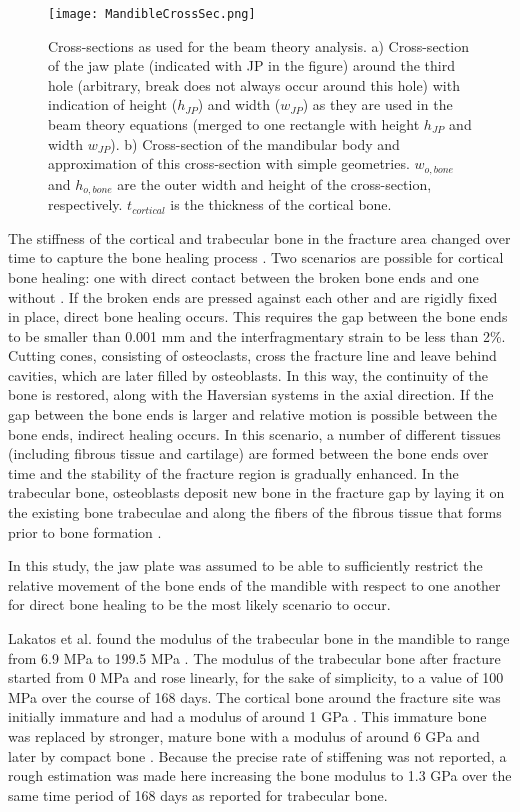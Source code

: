 \begin{figure}[h]
    \centering
    \medskip
    \texttt{[image: MandibleCrossSec.png]}
    \caption[Cross-sections as used for the beam theory analysis]{Cross-sections as used for the beam theory analysis. a) Cross-section of the jaw plate (indicated with JP in the figure) around the third hole (arbitrary, break does not always occur around this hole) with indication of height ($h_{JP}$) and width ($w_{JP}$) as they are used in the beam theory equations (merged to one rectangle with height $h_{JP}$ and width $w_{JP}$). b) Cross-section of the mandibular body and approximation of this cross-section with simple geometries. $w_{o,bone}$ and $h_{o,bone}$ are the outer width and height of the cross-section, respectively. $t_{cortical}$ is the thickness of the cortical bone.}
    \label{fig:MandibleCrossSec}
\end{figure}

The stiffness of the cortical and trabecular bone in the fracture area changed over time to capture the bone healing process \cite{Voss}. Two scenarios are possible for cortical bone healing: one with direct contact between the broken bone ends and one without \cite{Marsell}. If the broken ends are pressed against each other and are rigidly fixed in place, direct bone healing occurs. This requires the gap between the bone ends to be smaller than 0.001 mm and the interfragmentary strain to be less than 2\%. Cutting cones, consisting of osteoclasts, cross the fracture line and leave behind cavities, which are later filled by osteoblasts. In this way, the continuity of the bone is restored, along with the Haversian systems in the axial direction. If the gap between the bone ends is larger and relative motion is possible between the bone ends, indirect healing occurs. In this scenario, a number of different tissues (including fibrous tissue and cartilage) are formed between the bone ends over time and the stability of the fracture region is gradually enhanced. In the trabecular bone, osteoblasts deposit new bone in the fracture gap by laying it on the existing bone trabeculae and along the fibers of the fibrous tissue that forms prior to bone formation \cite{Voss}.

In this study, the jaw plate was assumed to be able to sufficiently restrict the relative movement of the bone ends of the mandible with respect to one another for direct bone healing to be the most likely scenario to occur.

Lakatos et al. found the modulus of the trabecular bone in the mandible to range from 6.9 MPa to 199.5 MPa \cite{Lakatos}. The modulus of the trabecular bone after fracture started from 0 MPa and rose linearly, for the sake of simplicity, to a value of 100 MPa over the course of 168 days. The cortical bone around the fracture site was initially immature and had a modulus of around 1 GPa \cite{Isaksson}. This immature bone was replaced by stronger, mature bone with a modulus of around 6 GPa and later by compact bone \cite{hawkeye}. Because the precise rate of stiffening was not reported, a rough estimation was made here increasing the bone modulus to 1.3 GPa over the same time period of 168 days as reported for trabecular bone.

